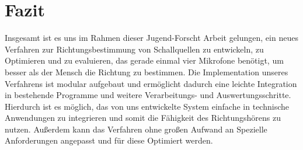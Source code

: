 \section{Fazit}
Insgesamt ist es uns im Rahmen dieser Jugend-Forscht Arbeit gelungen, ein neues Verfahren zur Richtungsbestimmung von Schallquellen zu entwickeln, zu Optimieren und zu evaluieren, das gerade einmal vier Mikrofone benötigt, um besser als der Mensch die Richtung zu bestimmen. Die Implementation unseres Verfahrens ist modular aufgebaut und ermöglicht dadurch eine leichte Integration in bestehende Programme und weitere Verarbeitungs- und Auswertungsschritte. Hierdurch ist es möglich, das von uns entwickelte System einfache in technische Anwendungen zu integrieren und somit die Fähigkeit des Richtungshörens zu nutzen. Außerdem kann das Verfahren ohne großen Aufwand an Spezielle Anforderungen angepasst und für diese Optimiert werden. 
